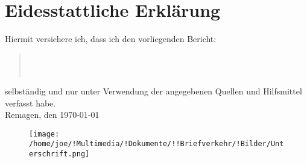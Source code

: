 \chapter{Eidesstattliche Erklärung}
Hiermit versichere ich, dass ich den vorliegenden Bericht:
\begin{quote}
\textit{\titel} \\ 
\textit{\untertitel} \\
\end{quote}
selbständig und nur unter Verwendung der angegebenen Quellen und Hilfsmittel verfasst habe.\\
Remagen, den \today
\begin{figure}[hp]
	\texttt{[image: /home/joe/!Multimedia/!Dokumente/!!Briefverkehr/!Bilder/Unterschrift.png]}
\end{figure}

\textsc{\autor} 
